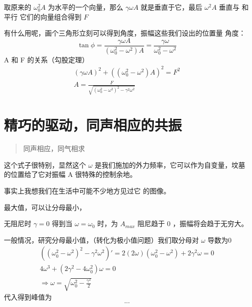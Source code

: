 \documentclass[11pt]{book}
\begin{document}
取原来的 \(\omega_0^2A\) 为水平的一个向量，那么 \(\gamma\omega A\) 就是垂直于它，最后 \(\omega^2A\) 垂直与
和
平行
它们的向量组合得到
\(F\)

有什么用呢，画个三角形立刻可以得到角度，振幅这些我们设出的位置量
角度：
\begin{equation}
\label{eq:72}
\tan\phi=\frac{\gamma\omega A}{(\omega_0^2-\omega^2)A}=\frac{\gamma\omega}{\omega_0^2-\omega^2}
\end{equation}
A 和 F 的关系（勾股定理）
\begin{align}
\label{eq:74}
(\gamma\omega A)^2+((\omega_0^2-\omega^2)A)^2=F^2 \\
A=\frac{F}{\sqrt{(\omega_0^2-\omega^2)^2-\gamma^2\omega^2}}
\end{align}
\section{精巧的驱动，同声相应的共振}
\label{sec:orgc039429}
\begin{quote}
同声相应，同气相求
\end{quote}

这个式子很特别，显然这个 \(\omega\) 是我们施加的外力频率，它可以作为自变量，坟墓的位置给了它对振幅 A 很特殊的控制余地。

事实上我想我们在生活中可能不少地方见过它
的图像。

最大值，可以让分母最小，

无阻尼时 \(\gamma=0\) 得到当 \(\omega=\omega_0\) 时，为 \(A_{max}\) 阻尼趋于 0 ，振幅将会趋于无穷大。

一般情况，研究分母最小值，（转化为极小值问题）我们取分母对 \(\omega\) 导数为0
\begin{equation}
\label{eq:76}
\begin{split}
((\omega_0^2-\omega^2)^2-\gamma^2\omega^2)'=2(2\omega)(\omega_0^2-\omega^2)+2\gamma^2\omega=0\\
4\omega^3+(2\gamma^2-4\omega_0^2)\omega=0 \\
\Rightarrow \omega=\sqrt{\omega_0^2-\frac{\gamma^2}{2}}
\end{split}
\end{equation}
代入得到峰值为
\begin{equation}
\label{eq:77}
...
\end{equation}
\end{document}
